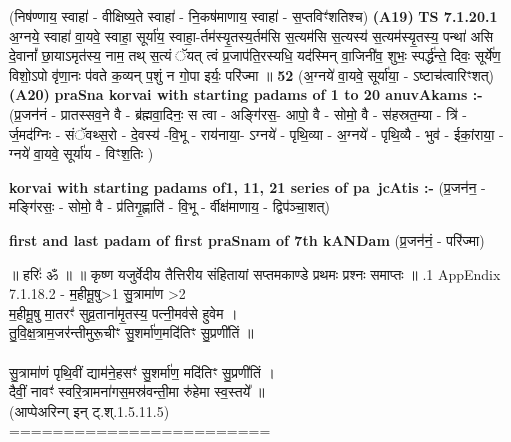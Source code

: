 \documentclass[17pt]{extarticle}
\begin{document}
                  \newline
                      (निष॑ण्णाय॒ स्वाहा॑ - वीक्षिष्य॒ते स्वाहा॑ - नि॒कष॑माणाय॒ स्वाहा॑ - स॒प्तविꣳ॑शतिश्च)  \textbf{(A19)} \newline \newline
                                        \textbf{ TS 7.1.20.1} \newline
                  अ॒ग्नये॒ स्वाहा॑ वा॒यवे॒ स्वाहा॒ सूर्या॑य॒ स्वाहा॒-र्तम॑स्यृ॒तस्य॒र्तम॑सि स॒त्यम॑सि स॒त्यस्य॑ स॒त्यम॑स्यृ॒तस्य॒ पन्था॑ असि दे॒वानां᳚ छा॒याऽमृत॑स्य॒ नाम॒ तथ् स॒त्यं ॅयत् त्वं प्र॒जाप॑ति॒रस्यधि॒ यद॑स्मिन् वा॒जिनी॑व॒ शुभः॒ स्पर्द्ध॑न्ते॒ दिवः॒ सूर्ये॑ण॒ विशो॒ऽपो वृ॑णा॒नः प॑वते क॒व्यन् प॒शुं न गो॒पा इर्यः॒ परि॑ज्मा ॥ \textbf{  52} \newline
                  \newline
                      (अ॒ग्नये॑ वा॒यवे॒ सूर्या॑या॒ - ऽष्टाच॑त्वारिꣳशत्)  \textbf{(A20)} \newline \newline
                \textbf{praSna korvai with starting padams of 1 to 20 anuvAkams :-} \newline
        (प्र॒जन॑नं - प्रातस्सव॒ने वै - ब्र॑ह्मवा॒दिनः॒ स त्वा - अङ्गि॑रस॒- आपो॒ वै - सोमो॒ वै - स॑हस्रत॒म्या - त्रि॑ - र्ज॒मद॑ग्निः - संॅवथ्स॒रो - दे॒वस्य॑ -वि॒भू - राय॑नाया॒- ऽग्नये॑ - पृथि॒व्या - अ॒ग्नये॑ - पृथि॒व्यै - भुव॑ - ईकां॒राया॒ - ग्नये॑ वा॒यवे॒ सूर्या॑य - विꣳश॒तिः ) \newline

        \textbf{korvai with starting padams of1, 11, 21 series of pa~jcAtis :-} \newline
        (प्र॒जन॑न॒ - मङ्गि॑रसः॒ - सोमो॒ वै - प्र॑तिगृ॒ह्णाति॑ - वि॒भू - र्वीक्ष॑माणाय॒ - द्विप॑ञ्चा॒शत्) \newline

        \textbf{first and last padam of first praSnam of 7th kANDam} \newline
        (प्र॒जन॑नं॒ - परि॑ज्मा) \newline 

        
        ॥ हरिः॑ ॐ ॥
॥ कृष्ण यजुर्वेदीय तैत्तिरीय संहितायां सप्तमकाण्डे प्रथमः प्रश्नः समाप्तः ॥ \newline
        .1   AppEndix\\7.1.18.2 - म॒हीमू॒षु>1 सु॒त्रामा॑ण >2\\म॒हीमू॒षु मा॒तरꣳ॑ सुव्र॒ताना॑मृ॒तस्य॒ पत्नी॒मव॑से हुवेम । \\तु॒वि॒क्ष॒त्राम॒जर॑न्तीमुरू॒चीꣳ सु॒शर्मा॑ण॒मदि॑तिꣳ सु॒प्रणी॑तिं ॥ \\\\सु॒त्रामा॑णं पृथि॒वीं द्याम॑ने॒हसꣳ॑ सु॒शर्मा॑ण॒ मदि॑तिꣳ सु॒प्रणी॑तिं । \\दैवीं॒ नावꣳ॑ स्वरि॒त्रामना॑गस॒मस्र॑वन्ती॒मा रु॑हेमा स्व॒स्तये᳚ ॥\\(आप्पेअरिन्ग् इन् ट्.श्.1.5.11.5)\\========================\\
                \pagebreak
        
\end{document}
